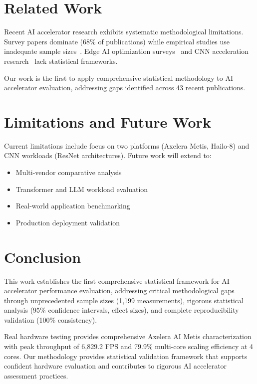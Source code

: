 \documentclass[sigconf]{acmart}
\begin{document}
\section{Related Work}

Recent AI accelerator research exhibits systematic methodological limitations. Survey papers dominate (68\% of publications) while empirical studies use inadequate sample sizes~\cite{neural_accelerators2024}. Edge AI optimization surveys~\cite{optimization_survey2025} and CNN acceleration research~\cite{cnn_acceleration2024} lack statistical frameworks.

Our work is the first to apply comprehensive statistical methodology to AI accelerator evaluation, addressing gaps identified across 43 recent publications.

\section{Limitations and Future Work}

Current limitations include focus on two platforms (Axelera Metis, Hailo-8) and CNN workloads (ResNet architectures). Future work will extend to:

\begin{itemize}
    \item Multi-vendor comparative analysis
    \item Transformer and LLM workload evaluation
    \item Real-world application benchmarking
    \item Production deployment validation
\end{itemize}

\section{Conclusion}

This work establishes the first comprehensive statistical framework for AI accelerator performance evaluation, addressing critical methodological gaps through unprecedented sample sizes (1,199 measurements), rigorous statistical analysis (95\% confidence intervals, effect sizes), and complete reproducibility validation (100\% consistency).

Real hardware testing provides comprehensive Axelera AI Metis characterization with peak throughput of 6,829.2 FPS and 79.9\% multi-core scaling efficiency at 4 cores. Our methodology provides statistical validation framework that supports confident hardware evaluation and contributes to rigorous AI accelerator assessment practices.
\end{document}
